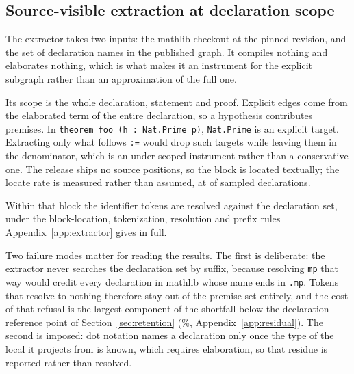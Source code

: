 
\subsection{Source-visible extraction at declaration scope}
\label{sec:extraction}

The extractor takes two inputs: the mathlib checkout at the pinned revision,
and the set of declaration names in the published graph. It compiles nothing
and elaborates nothing, which is what makes it an instrument for the explicit
subgraph rather than an approximation of the full one.

Its scope is the whole declaration, statement and proof. Explicit edges come
from the elaborated term of the entire declaration, so a hypothesis contributes
premises. In \texttt{theorem foo (h : Nat.Prime p)}, \texttt{Nat.Prime} is
an explicit target. Extracting only what follows \texttt{:=} would drop
such targets while leaving them in the denominator, which is an under-scoped
instrument rather than a conservative one. The release ships no source
positions, so the block is located textually; the locate rate is measured
rather than assumed, at \auditDeclsLocated{} of \auditDeclsDrawn{} sampled
declarations.

Within that block the identifier tokens are resolved against the declaration
set, under the block-location, tokenization, resolution and prefix rules
Appendix~\ref{app:extractor} gives in full.

Two failure modes matter for reading the results. The first is deliberate: the
extractor never searches the declaration set by suffix, because resolving
\texttt{mp} that way would credit every declaration in mathlib whose name ends
in \texttt{.mp}. Tokens that resolve to nothing therefore stay out of the
premise set entirely, and the cost of that refusal is the largest component of the
shortfall below the declaration reference point of Section~\ref{sec:retention}
(\residualResolutionPct{}\%, Appendix~\ref{app:residual}). The second is
imposed: dot notation names a declaration only once the type of the local it
projects from is known, which requires elaboration, so that residue is reported
rather than resolved.

